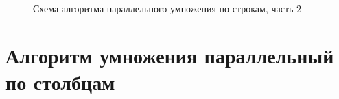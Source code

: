 \documentclass[12pt,a4paper]{report}
\begin{document}
\begin{figure}[h!]
    \caption{Схема алгоритма параллельного умножения по строкам, часть 2}
    \label{fig:image}
\end{figure} 

\section{Алгоритм умножения параллельный по столбцам}
\end{document}
